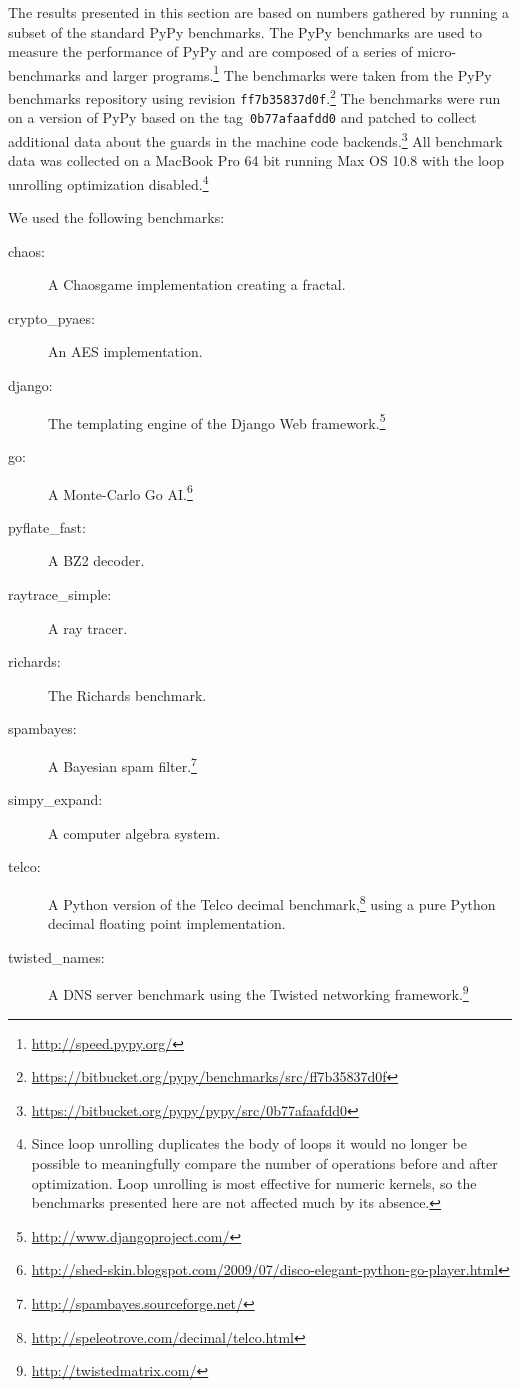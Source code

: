\documentclass[10pt,preprint]{sigplanconf}
\begin{document}
The results presented in this section are based on numbers gathered by running
a subset of the standard PyPy benchmarks. The PyPy benchmarks are used to
measure the performance of PyPy and are composed of a series of
micro-benchmarks and larger programs.\footnote{\url{http://speed.pypy.org/}} The
benchmarks were taken from the PyPy benchmarks repository using revision
\texttt{ff7b35837d0f}.\footnote{\url{https://bitbucket.org/pypy/benchmarks/src/ff7b35837d0f}}
The benchmarks were run on a version of PyPy based on the
tag~\texttt{0b77afaafdd0} and patched to collect additional data about the
guards in the machine code
backends.\footnote{\url{https://bitbucket.org/pypy/pypy/src/0b77afaafdd0}} All
benchmark data was collected on a MacBook Pro 64 bit running Max OS 10.8 with
the loop unrolling optimization disabled.\footnote{Since loop unrolling
duplicates the body of loops it would no longer be possible to meaningfully
compare the number of operations before and after optimization. Loop unrolling
is most effective for numeric kernels, so the benchmarks presented here are not
affected much by its absence.}

We used the following benchmarks:

\begin{description}
    \item[chaos:] A Chaosgame implementation creating a fractal.
    \item[crypto\_pyaes:] An AES implementation.
    \item[django:] The templating engine of the Django Web
        framework.\footnote{\url{http://www.djangoproject.com/}}

    \item[go:] A Monte-Carlo Go
        AI.\footnote{\url{http://shed-skin.blogspot.com/2009/07/disco-elegant-python-go-player.html}}
    \item[pyflate\_fast:] A BZ2 decoder.
    \item[raytrace\_simple:] A ray tracer.
    \item[richards:] The Richards benchmark.
    \item[spambayes:] A Bayesian spam filter.\footnote{\url{http://spambayes.sourceforge.net/}}
    \item[simpy\_expand:] A computer algebra system.
    \item[telco:] A Python version of the Telco decimal
        benchmark,\footnote{\url{http://speleotrove.com/decimal/telco.html}}
        using a pure Python decimal floating point implementation.
    \item[twisted\_names:] A DNS server benchmark using the Twisted networking
        framework.\footnote{\url{http://twistedmatrix.com/}}
\end{description}
\end{document}
